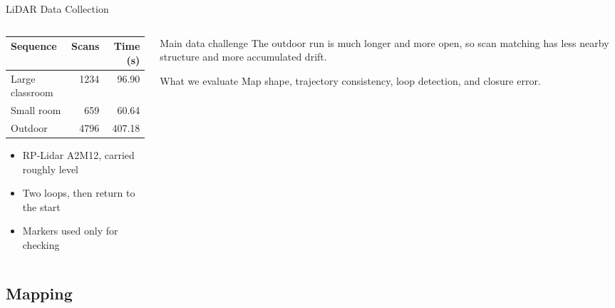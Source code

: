 \documentclass[aspectratio=169]{beamer}
\begin{document}
\begin{frame}{LiDAR Data Collection}
  \small
  \begin{columns}[T,onlytextwidth]
    \begin{column}{0.47\textwidth}
      \begin{table}
      \centering
      \scriptsize
      \begin{tabular}{lrr}
      \toprule
      Sequence & Scans & Time (s) \\
      \midrule
      Large classroom & 1234 & 96.90 \\
      Small room & 659 & 60.64 \\
      Outdoor & 4796 & 407.18 \\
      \bottomrule
      \end{tabular}
      \end{table}
      \vspace{0.2em}
      \begin{itemize}
        \item RP-Lidar A2M12, carried roughly level
        \item Two loops, then return to the start
        \item Markers used only for checking
      \end{itemize}
    \end{column}
    \begin{column}{0.49\textwidth}
      \begin{block}{Main data challenge}
        The outdoor run is much longer and more open, so scan matching has less nearby structure and more accumulated drift.
      \end{block}
      \vspace{0.2em}
      \begin{block}{What we evaluate}
        Map shape, trajectory consistency, loop detection, and closure error.
      \end{block}
    \end{column}
  \end{columns}
\end{frame}

\subsection{Mapping}
\end{document}
